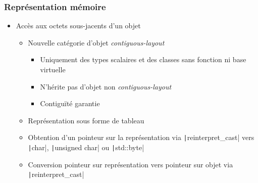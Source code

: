 \documentclass[C++.tex]{subfiles}
\begin{document}
\begin{frame}[fragile]
	\frametitle{Représentation mémoire}
	\begin{itemize}
		\item Accès aux octets sous-jacents d'un objet
		\begin{itemize}
			\item Nouvelle catégorie d'objet \textit{contiguous-layout}
			\begin{itemize}
				\item Uniquement des types scalaires et des classes sans fonction ni base virtuelle
				\item N'hérite pas d'objet non \textit{contiguous-layout}
				\item Contiguïté garantie
			\end{itemize}
			\item Représentation sous forme de tableau
			\item Obtention d'un pointeur sur la représentation via \texttt|reinterpret_cast| vers \texttt|char|, \texttt|unsigned char| ou \texttt|std::byte|
			\item Conversion pointeur sur représentation vers pointeur sur objet via \texttt|reinterpret_cast|
		\end{itemize}
	\end{itemize}
\end{frame}
\end{document}
